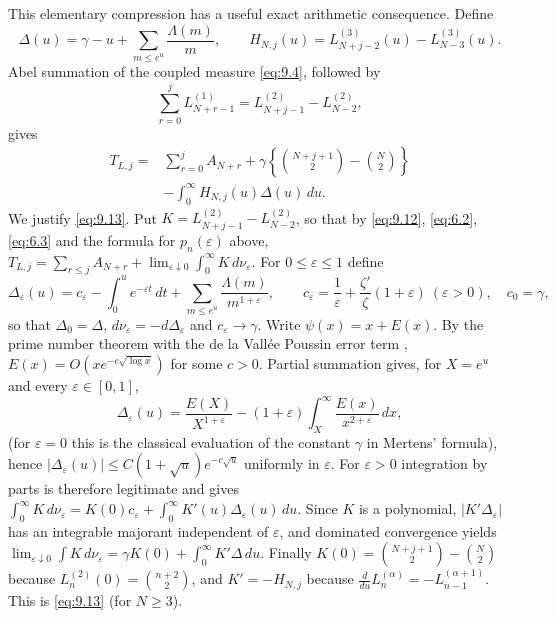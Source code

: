 \documentclass[11pt]{amsart}
\numberwithin{equation}{section}
\theoremstyle{definition}
\theoremstyle{remark}
\newcommand{\eps}{\varepsilon}
\begin{document}
This elementary compression has a useful exact arithmetic consequence.
Define
\begin{equation}
 \Delta(u)=\gamma-u+\sum_{m\le e^u}\frac{\Lambda(m)}m,
 \qquad
 H_{N,j}(u)=L_{N+j-2}^{(3)}(u)-L_{N-3}^{(3)}(u).        \label{eq:9.11}
\end{equation}
Abel summation of the coupled measure \eqref{eq:9.4}, followed by
\begin{equation}
 \sum_{r=0}^{j}L_{N+r-1}^{(1)}
 =L_{N+j-1}^{(2)}-L_{N-2}^{(2)},                        \label{eq:9.12}
\end{equation}
gives
\begin{equation}
\begin{split}
 T_{L,j}={}&\sum_{r=0}^{j}A_{N+r}
 +\gamma\left\{
 \binom{N+j+1}{2}-\binom N2\right\}\\
 &-\int_0^\infty H_{N,j}(u)\Delta(u)\,du.
\end{split}                                               \label{eq:9.13}
\end{equation}
We justify \eqref{eq:9.13}. Put \(K=L_{N+j-1}^{(2)}-L_{N-2}^{(2)}\), so
that by \eqref{eq:9.12}, \eqref{eq:6.2}, \eqref{eq:6.3} and the formula for
\(p_n(\eps)\) above, \(T_{L,j}=\sum_{r\le j}A_{N+r}
+\lim_{\eps\downarrow0}\int_0^\infty K\,d\nu_\eps\). For \(0\le\eps\le1\)
define
\[
 \Delta_\eps(u)=c_\eps-\int_0^ue^{-\eps t}\,dt
 +\sum_{m\le e^u}\frac{\Lambda(m)}{m^{1+\eps}},\qquad
 c_\eps=\frac1\eps+\frac{\zeta'}{\zeta}(1+\eps)\ (\eps>0),\quad c_0=\gamma,
\]
so that \(\Delta_0=\Delta\), \(d\nu_\eps=-d\Delta_\eps\) and
\(c_\eps\to\gamma\). Write \(\psi(x)=x+E(x)\). By the prime number theorem
with the de la Vall\'ee Poussin error term \cite{Titchmarsh},
\(E(x)=O(xe^{-c\sqrt{\log x}})\) for some \(c>0\). Partial summation gives,
for \(X=e^u\) and every \(\eps\in[0,1]\),
\[
 \Delta_\eps(u)=\frac{E(X)}{X^{1+\eps}}
 -(1+\eps)\int_X^\infty\frac{E(x)}{x^{2+\eps}}\,dx ,
\]
(for \(\eps=0\) this is the classical evaluation of the constant \(\gamma\)
in Mertens' formula), hence
\(|\Delta_\eps(u)|\le C(1+\sqrt u)e^{-c\sqrt u}\) uniformly in \(\eps\).
For \(\eps>0\) integration by parts is therefore legitimate and gives
\(\int_0^\infty K\,d\nu_\eps=K(0)c_\eps+\int_0^\infty K'(u)\Delta_\eps(u)\,du\).
Since \(K\) is a polynomial, \(|K'\Delta_\eps|\) has an integrable majorant
independent of \(\eps\), and dominated convergence yields
\(\lim_{\eps\downarrow0}\int K\,d\nu_\eps=\gamma K(0)+\int_0^\infty K'\Delta\,du\).
Finally \(K(0)=\binom{N+j+1}2-\binom N2\) because
\(L_n^{(2)}(0)=\binom{n+2}2\), and
\(K'=-H_{N,j}\) because \(\frac{d}{du}L_n^{(\alpha)}=-L_{n-1}^{(\alpha+1)}\).
This is \eqref{eq:9.13} (for \(N\ge3\)).
\end{document}
